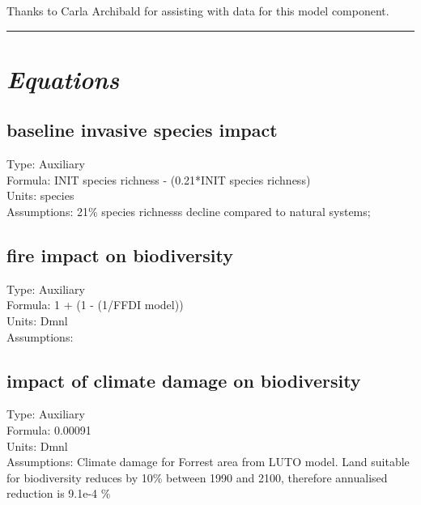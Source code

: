 \documentclass[
  11pt,
]{book}
\begin{document}
Thanks to Carla Archibald for assisting with data for this model component.

\begin{center}\rule{0.5\linewidth}{0.5pt}\end{center}

\hypertarget{equations-5}{%
\section{\texorpdfstring{\emph{Equations}}{Equations}}\label{equations-5}}

\hypertarget{baseline-invasive-species-impact}{%
\subsection{baseline invasive species impact}\label{baseline-invasive-species-impact}}

Type: Auxiliary\\
Formula: INIT species richness - (0.21*INIT species richness)\\
Units: species\\
Assumptions: 21\% species richnesss decline compared to natural systems; \citet{crystal-ornelas_cumulative_2020}

\hypertarget{fire-impact-on-biodiversity}{%
\subsection{fire impact on biodiversity}\label{fire-impact-on-biodiversity}}

Type: Auxiliary\\
Formula: 1 + (1 - (1/FFDI model))\\
Units: Dmnl\\
Assumptions:

\hypertarget{impact-of-climate-damage-on-biodiversity}{%
\subsection{impact of climate damage on biodiversity}\label{impact-of-climate-damage-on-biodiversity}}

Type: Auxiliary\\
Formula: 0.00091\\
Units: Dmnl\\
Assumptions: Climate damage for Forrest area from LUTO model. Land suitable for biodiversity reduces by 10\% between 1990 and 2100, therefore annualised reduction is 9.1e-4 \%
\end{document}
